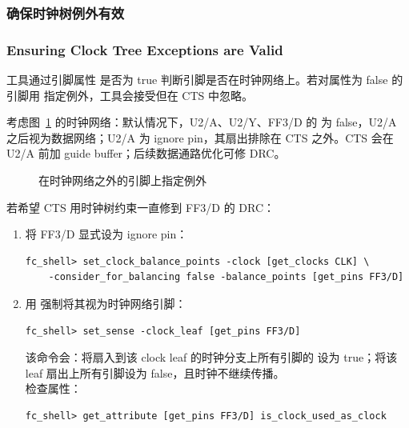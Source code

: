 \subsubsection{确保时钟树例外有效}
\subsubsection*{Ensuring Clock Tree Exceptions are Valid}

工具通过引脚属性  是否为 true 判断引脚是否在时钟网络上。若对属性为 false 的引脚用  指定例外，工具会接受但在 CTS 中忽略。

考虑图~\ref{fig:cts-beyond-net} 的时钟网络：默认情况下，U2/A、U2/Y、FF3/D 的  为 false，U2/A 之后视为数据网络；U2/A 为 ignore pin，其扇出排除在 CTS 之外。CTS 会在 U2/A 前加 guide buffer；后续数据通路优化可修 DRC。

\begin{figure}[htbp]
\centering
{}
\caption{在时钟网络之外的引脚上指定例外}
\label{fig:cts-beyond-net}
\end{figure}

若希望 CTS 用时钟树约束一直修到 FF3/D 的 DRC：
\begin{enumerate}
  \item 将 FF3/D 显式设为 ignore pin：
\begin{lstlisting}
fc_shell> set_clock_balance_points -clock [get_clocks CLK] \
    -consider_for_balancing false -balance_points [get_pins FF3/D]
\end{lstlisting}
  \item 用  强制将其视为时钟网络引脚：
\begin{lstlisting}
fc_shell> set_sense -clock_leaf [get_pins FF3/D]
\end{lstlisting}
        该命令会：将扇入到该 clock leaf 的时钟分支上所有引脚的  设为 true；将该 leaf 扇出上所有引脚设为 false，且时钟不继续传播。\\
        检查属性：
\begin{lstlisting}
fc_shell> get_attribute [get_pins FF3/D] is_clock_used_as_clock
\end{lstlisting}
\end{enumerate}

